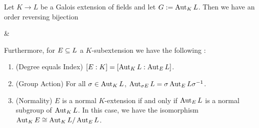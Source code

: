 \documentclass{article}
\begin{document}
\begin{prop}

  Let $K \to L$ be a Galois extension of fields
  and let $G := \operatorname{Aut}_K L$.
  Then we have an order reversing bijection \begin{cd}
    {} & 
    {}
    \arrow["{\mathrm{Aut}_\_ L}", shift left=3, from=1-1, to=1-2]
    \arrow["\simeq"{description}, draw=none, from=1-1, to=1-2]
    \arrow["{L^\_}", shift left=3, from=1-2, to=1-1]
  \end{cd}
  Furthermore, for $E \subseteq L$ a $K$-subextension 
  we have the following : 
  \begin{enumerate}
    \item (Degree equals Index)
    $[E : K] = [\operatorname{Aut}_{K}{L} : \operatorname{Aut}_{E}{L}]$.
    \item (Group Action)
    For all $\sigma \in \operatorname{Aut}_{K}{L}$, 
    $\operatorname{Aut}_{\sigma E}{L} = \sigma \operatorname{Aut}_{E}{L} \sigma^{-1}$. 
    \item (Normality) 
    $E$ is a normal $K$-extension if and only if 
    $\operatorname{Aut}_{E}{L}$ is a normal subgroup of $\operatorname{Aut}_{K}{L}$. 
    In this case, we have the isomorphism 
    $\operatorname{Aut}_{K}{E} \cong \operatorname{Aut}_{K}{L} / \operatorname{Aut}_{E}{L}$. 
  \end{enumerate}
\end{prop}
\end{document}
